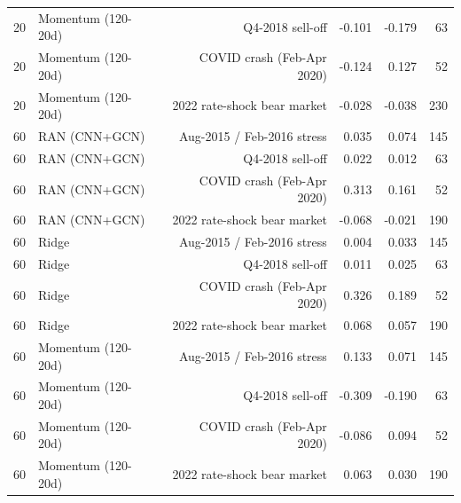 \begin{table}[htbp]
{\begin{tabular}{llrrrr}
20 & Momentum (120-20d) & Q4-2018 sell-off & -0.101 & -0.179 & 63 \\
20 & Momentum (120-20d) & COVID crash (Feb-Apr 2020) & -0.124 & 0.127 & 52 \\
20 & Momentum (120-20d) & 2022 rate-shock bear market & -0.028 & -0.038 & 230 \\
60 & RAN (CNN+GCN) & Aug-2015 / Feb-2016 stress & 0.035 & 0.074 & 145 \\
60 & RAN (CNN+GCN) & Q4-2018 sell-off & 0.022 & 0.012 & 63 \\
60 & RAN (CNN+GCN) & COVID crash (Feb-Apr 2020) & 0.313 & 0.161 & 52 \\
60 & RAN (CNN+GCN) & 2022 rate-shock bear market & -0.068 & -0.021 & 190 \\
60 & Ridge & Aug-2015 / Feb-2016 stress & 0.004 & 0.033 & 145 \\
60 & Ridge & Q4-2018 sell-off & 0.011 & 0.025 & 63 \\
60 & Ridge & COVID crash (Feb-Apr 2020) & 0.326 & 0.189 & 52 \\
60 & Ridge & 2022 rate-shock bear market & 0.068 & 0.057 & 190 \\
60 & Momentum (120-20d) & Aug-2015 / Feb-2016 stress & 0.133 & 0.071 & 145 \\
60 & Momentum (120-20d) & Q4-2018 sell-off & -0.309 & -0.190 & 63 \\
60 & Momentum (120-20d) & COVID crash (Feb-Apr 2020) & -0.086 & 0.094 & 52 \\
60 & Momentum (120-20d) & 2022 rate-shock bear market & 0.063 & 0.030 & 190 \\
\bottomrule
\end{tabular}}
\end{table}
